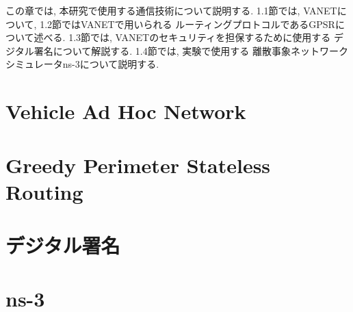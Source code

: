 この章では, 本研究で使用する通信技術について説明する. 
1.1節では, VANETについて, 1.2節ではVANETで用いられる
ルーティングプロトコルであるGPSRについて述べる. 
1.3節では, VANETのセキュリティを担保するために使用する
デジタル署名について解説する. 1.4節では, 実験で使用する
離散事象ネットワークシミュレータns-3について説明する. 

\section{Vehicle Ad Hoc Network}

\section{Greedy Perimeter Stateless Routing}

\section{デジタル署名}

\section{ns-3}

